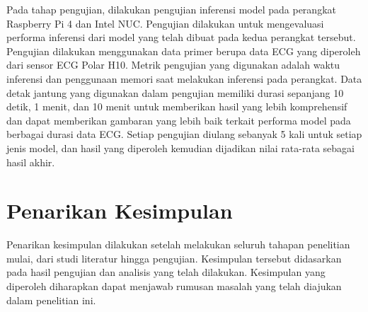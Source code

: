 
Pada tahap pengujian, dilakukan pengujian inferensi model pada perangkat Raspberry Pi 4 dan Intel NUC.
Pengujian dilakukan untuk mengevaluasi performa inferensi dari model yang telah dibuat pada kedua perangkat tersebut.
Pengujian dilakukan menggunakan data primer berupa data ECG yang diperoleh dari sensor ECG Polar H10.
Metrik pengujian yang digunakan adalah waktu inferensi dan penggunaan memori saat melakukan inferensi pada perangkat.
Data detak jantung yang digunakan dalam pengujian memiliki durasi sepanjang 10 detik, 1 menit, dan 10 menit untuk memberikan hasil yang lebih komprehensif dan dapat memberikan gambaran yang lebih baik terkait performa model pada berbagai durasi data ECG.
Setiap pengujian diulang sebanyak 5 kali untuk setiap jenis model, dan hasil yang diperoleh kemudian dijadikan nilai rata-rata sebagai hasil akhir.

\section{Penarikan Kesimpulan}
\label{subsec: metodologi-penarikan-kesimpulan}
Penarikan kesimpulan dilakukan setelah melakukan seluruh tahapan penelitian mulai, dari studi literatur hingga pengujian.
Kesimpulan tersebut didasarkan pada hasil pengujian dan analisis yang telah dilakukan.
Kesimpulan yang diperoleh diharapkan dapat menjawab rumusan masalah yang telah diajukan dalam penelitian ini.

%

%
